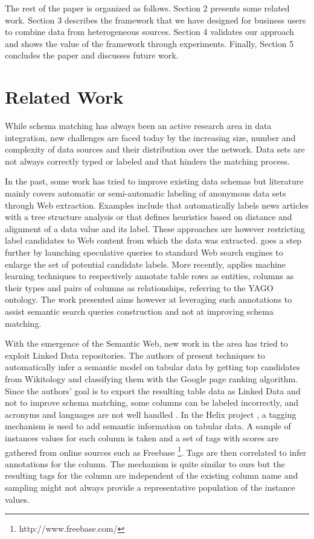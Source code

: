 \documentclass{sig-alternate}
\begin{document}
The rest of the paper is organized as follows. Section 2 presents some related work. Section 3 describes the framework that we have designed for business users to combine data from heterogeneous sources. Section 4 validates our approach and shows the value of the framework through experiments. Finally, Section 5 concludes the paper and discusses future work.


\section{Related Work}

While schema matching has always been an active research area in data integration, new challenges are faced today by the increasing size, number and complexity of data sources and their distribution over the network. Data sets are not always correctly typed or labeled and that hinders the matching process.

In the past, some work has tried to improve existing data schemas \cite{ DBLP:journals/debu/MillerA03} but literature mainly covers automatic or semi-automatic labeling of anonymous data sets through Web extraction. Examples include \cite{cas04} that automatically labels news articles with a tree structure analysis or \cite{wang2003extraction} that defines heuristics based on distance and alignment of a data value and its label. These approaches are however restricting label candidates to Web content from which the data was extracted. \cite{DBLP:conf/otm/SilvaBCS07} goes a step further by launching speculative queries to standard Web search engines to enlarge the set of potential candidate labels. More recently, \cite{Limaye:2010:ASW:1920841.1921005} applies machine learning techniques to respectively annotate table rows as entities, columns as their types and pairs of columns as relationships, referring to the YAGO ontology. The work presented aims however at leveraging such annotations to assist semantic search queries construction and not at improving schema matching.

With the emergence of the Semantic Web, new work in the area has tried to exploit Linked Data repositories. The authors of \cite{Syed2010Tables} present techniques to automatically infer a semantic model on tabular data by getting top candidates from Wikitology \cite{conf/aaaiss/FininSMMP09} and classifying them with the Google page ranking algorithm. Since the authors' goal is to export the resulting table data as Linked Data and not to improve schema matching, some columns can be labeled incorrectly, and acronyms and languages are not well handled \cite{Syed2010Tables}. In the Helix project \cite{conf/www/HassanzadehDFKSW11}, a tagging mechanism is used to add semantic information on tabular data. A sample of instances values for each column is taken and a set of tags with scores are gathered from online sources such as Freebase \footnote{http://www.freebase.com/}. Tags are then correlated to infer annotations for the column. The mechanism is quite similar to ours but the resulting tags for the column are independent of the existing column name and sampling might not always provide a representative population of the instance values.
\end{document}
